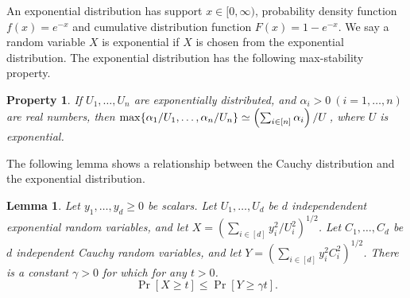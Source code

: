 \documentclass[11pt]{article}
\newtheorem{lemma}[theorem]{Lemma}
\newtheorem{property}{Property}
\begin{document}
An exponential distribution has support $x \in [0, \infty)$, probability density function 
$f(x) = e^{-x}$ and cumulative distribution function $F(x) = 1 - e^{-x}$. 
We say a random variable $X$ is exponential if $X$ is chosen from the exponential distribution. 
The exponential distribution has the following max-stability property.
\begin{property}
\label{prop:exp}
If $U_1, \ldots, U_n$ are exponentially distributed, and $\alpha_i > 0\ (i = 1, \ldots, n)$ are real numbers, then 
$\textstyle \max\{\alpha_1 / U_1, \ldots, \alpha_n / U_n\} \simeq \left(\sum_{i \in [n]} \alpha_i \right) \left/ U \right.$,
where $U$ is exponential.
\end{property}
The following lemma shows a relationship between the Cauchy distribution and the exponential distribution. 
\begin{lemma}
\label{lem:tail-squared}
Let $y_1, \ldots, y_d \geq 0$ be scalars. 
Let $U_1, \ldots, U_d$ be $d$ independendent exponential random variables, 
and let $X = (\sum_{i \in [d]} y_i^2/U_i^2)^{1/2}$. Let $C_1, \ldots, C_d$ be $d$ independent Cauchy
random variables, and let $Y = (\sum_{i \in [d]} y_i^2 C_i^2)^{1/2}$. 
There is a constant $\gamma > 0$ for which for any $t > 0$. 
$$\Pr[X \geq t] \leq \Pr[Y \geq \gamma t].$$
\end{lemma}
\end{document}
